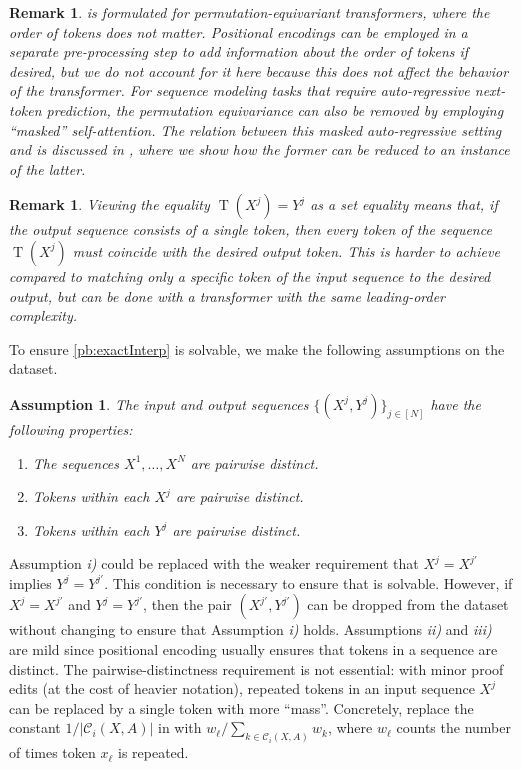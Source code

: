 \documentclass[pdflatex,sn-mathphys-num]{sn-jnl}%
\theoremstyle{thmstyleone}%
\theoremstyle{thmstyletwo}%
\newtheorem{remark}[theorem]{Remark}
\theoremstyle{thmstylethree}%
\newtheorem{ass}[theorem]{Assumption}
\numberwithin{equation}{section}
\DeclareMathOperator{\T}{\mathrm{T}}
\begin{document}
\begin{remark}
     is formulated for permutation-equivariant transformers, where the order of tokens does not matter. Positional encodings \cite{vaswaniAttentionAllYou2017} can be employed in a separate pre-processing step to add information about the order of tokens if desired, but we do not account for it here because this does not affect the behavior of the transformer. For sequence modeling tasks that require auto-regressive next-token prediction, the permutation equivariance can also be removed by employing ``masked'' self-attention. The relation between this masked auto-regressive setting and  is discussed in , where we show how the former can be reduced to an instance of the latter.
\end{remark}
\begin{remark}
    Viewing the equality $\T(X^j)=Y^j$ as a set equality means that, if the output sequence consists of a single token, then \emph{every} token of the sequence $\T(X^j)$ must coincide with the desired output token. This is harder to achieve compared to matching only a specific token of the input sequence to the desired output, but can be done with a transformer with the same leading-order complexity.
\end{remark}
To ensure \cref{pb:exactInterp} is solvable, we make the following assumptions on the dataset.

\begin{ass}\label{ass:dataset}
    The input and output sequences $\{(X^j, Y^j)\}_{j\in [N]}$ have the following properties:
    \begin{enumerate}
    \item[i)] The sequences $X^1,\ldots, X^N$ are pairwise distinct.
    \item[ii)] Tokens within each $X^j$ are pairwise distinct.
    \item[iii)] Tokens within each $Y^j$ are pairwise distinct.
    \end{enumerate}
\end{ass}

Assumption \textit{i)} could be replaced with the weaker requirement that $X^j=X^{j'}$ implies $Y^j = Y^{j'}$. This condition is necessary to ensure that  is solvable. However, if $X^{j}=X^{j'}$ and $Y^j = Y^{j'}$, then the pair $(X^{j'}, Y^{j'})$ can be dropped from the dataset without changing  to ensure that Assumption \textit{i)} holds.
Assumptions \textit{ii)} and \textit{iii)} are mild since positional encoding \cite{press2022trainshorttestlong} usually ensures that tokens in a sequence are distinct. 
The pairwise-distinctness requirement is not essential: with minor proof edits (at the cost of heavier notation), repeated tokens in an input sequence $X^j$ can be replaced by a single token with more ``mass''. Concretely, replace the constant $1/|\mathcal{C}_i(X,A)|$ in  with $w_\ell/\sum_{k \in \mathcal{C}_i(X,A)} w_k$, where $w_\ell$ counts the number of times token $x_\ell$ is repeated.
\end{document}
